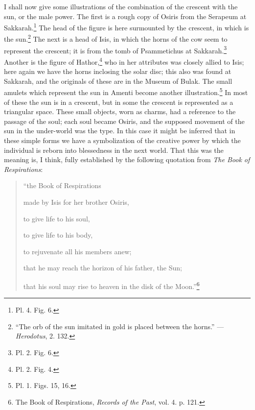 \documentclass[a4paper, 11pt, oneside, english, landscape, twocolumn]{article}
\begin{document}
I shall now give some illustrations of the combination of the crescent with the sun, or the male power. The first is a rough copy of Osiris from the Serapeum at Sakkarah.\footnote{Pl. 4. Fig. 6.} The head of the figure is here surmounted by the crescent, in which is the sun.\footnote{``The orb of the sun imitated in gold is placed between the horns.'' --- \emph{Herodotus}, 2. 132.} The next is a head of Isis, in which the horns of the cow seem to represent the crescent; it is from the tomb of Psammetichus at Sakkarah.\footnote{Pl. 2. Fig. 6.} Another is the figure of Hathor,\footnote{Pl. 2. Fig. 4.} who in her attributes was closely allied to Isis; here again we have the horns inclosing the solar disc; this also was found at Sakkarah, and the originals of these are in the Museum of Bulak. The small amulets which represent the sun in Amenti become another illustration.\footnote{Pl. 1. Figs. 15, 16.} In most of these the sun is in a crescent, but in some the crescent is represented as a triangular space. These small objects, worn as charms, had a reference to the passage of the soul; each soul became Osiris, and the supposed movement of the sun in the under-world was the type. In this case it might be inferred that in these simple forms we have a symbolization of the creative power by which the individual is reborn into blessedness in the next world. That this was the meaning is, I think, fully established by the following quotation from \emph{The Book of Respirations}:
\begin{quotation}
\footnotesize
``the Book of Respirations

made by Isis for her brother Osiris,

to give life to his soul,

to give life to his body,

to rejuvenate all his members anew;

that he may reach the horizon of his father, the Sun;

that his soul may rise to heaven in the disk of the Moon.''\footnote{The Book of Respirations, \emph{Records of the Past}, vol. 4. p. 121.}
\end{quotation}
\end{document}

